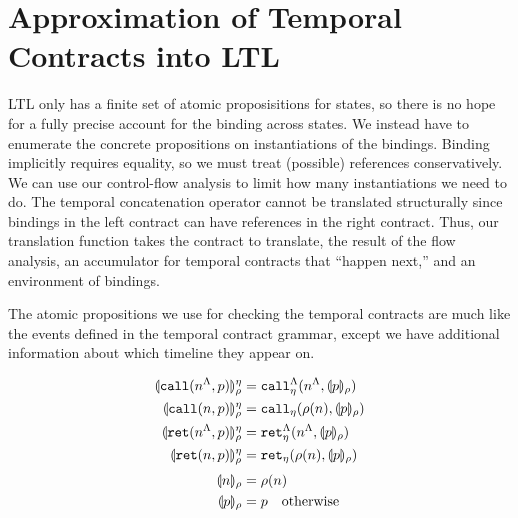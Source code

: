 \documentclass[preprint,onecolumn,9pt]{sigplanconf} %
\begin{document}
\section{Approximation of Temporal Contracts into LTL}

LTL only has a finite set of atomic proposisitions for states, so there is no hope for a fully precise account for the binding across states.
%
We instead have to enumerate the concrete propositions on instantiations of the bindings.
%
Binding implicitly requires equality, so we must treat (possible) references conservatively.
%
We can use our control-flow analysis to limit how many instantiations we need to do.
%
The temporal concatenation operator cannot be translated structurally since bindings in the left contract can have references in the right contract.
%
Thus, our translation function takes the contract to translate, the result of the flow analysis, an accumulator for temporal contracts that ``happen next,'' and an environment of bindings.

The atomic propositions we use for checking the temporal contracts are much like the events defined in the temporal contract grammar, except we have additional information about which timeline they appear on.

\begin{align*}
  \llparenthesis {\tt call}(n^\Lambda, p) \rrparenthesis_{\rho}^{\eta} &=
    {\tt call}_{\eta}^{\Lambda}(n^\Lambda,\llparenthesis p \rrparenthesis_{\rho})
\\
  \llparenthesis {\tt call}(n, p) \rrparenthesis_{\rho}^{\eta} &=
    {\tt call}_{\eta}(\rho(n),\llparenthesis p \rrparenthesis_{\rho})
\\
  \llparenthesis {\tt ret}(n^\Lambda, p) \rrparenthesis_{\rho}^{\eta} &=
    {\tt ret}_{\eta}^{\Lambda}(n^\Lambda,\llparenthesis p \rrparenthesis_{\rho})
\\
  \llparenthesis {\tt ret}(n, p) \rrparenthesis_{\rho}^{\eta} &=
    {\tt ret}_{\eta}(\rho(n),\llparenthesis p \rrparenthesis_{\rho})
\\[2pt]
  \llparenthesis n \rrparenthesis_{\rho} &= \rho(n)
\\
  \llparenthesis p \rrparenthesis_{\rho} &= p \quad\text{otherwise}
\end{align*}
\end{document}
